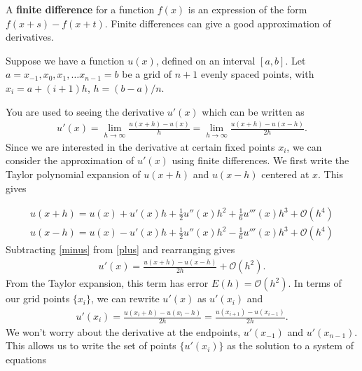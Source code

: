 \label{lab:finitedifference2}

A \textbf{finite difference} for a function $f(x)$ is an expression of the form $f(x+s)-f(x+t)$.
Finite differences can give a good approximation of derivatives.

Suppose we have a function $u(x)$, defined on an interval $[a,b]$.
Let $a = x_{-1}, x_0, x_1, \ldots x_{n-1}=b$ be a grid of $n+1$ evenly spaced points, with $x_i = a + (i+1)h$, $h = (b-a)/n$.

You are used to seeing the derivative $u'(x)$ which can be written as
\begin{align*}
u'(x)=\lim_{h\to\infty}\frac{u(x+h)-u(x)}{h}=\lim_{h\to\infty}\frac{u(x+h)-u(x-h)}{2h}.
 \end{align*} 
Since we are interested in the derivative at certain fixed points $x_i$, we can consider the approximation of $u'(x)$ using finite differences.
We first write the Taylor polynomial expansion of $u(x+h)$ and $u(x-h)$ centered at $x$. This gives

\begin{align}
u(x+h)=u(x)+u'(x)h+\frac{1}{2}u''(x)h^2+\frac{1}{6}u'''(x)h^3+\mathcal{O}(h^4)\label{plus}\\
u(x-h)=u(x)-u'(x)h+\frac{1}{2}u''(x)h^2-\frac{1}{6}u'''(x)h^3+\mathcal{O}(h^4)\label{minus}
\end{align}
Subtracting \eqref{minus} from \eqref{plus} and rearranging gives
\begin{align*}
u'(x)=\frac{u(x+h)-u(x-h)}{2h}+\mathcal{O}(h^2).
\end{align*}
From the Taylor expansion, this term has error $E(h)=\mathcal{O}(h^2)$.
In terms of our grid points $\{x_i\}$, we can rewrite $u'(x)$ as $u'(x_i)$ and
\begin{align*}
u'(x_i)=\frac{u(x_i+h)-u(x_i-h)}{2h}=\frac{u(x_{i+1})-u(x_{i-1})}{2h}.
\end{align*}
We won't worry about the derivative at the endpoints, $u'(x_{-1})$ and $u'(x_{n-1})$.
This allows us to write the set of points $\{u'(x_i)\}$ as the solution to a system of equations

